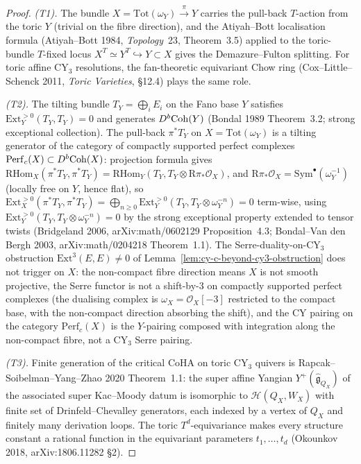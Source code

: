 \begin{proof}
\emph{(T1).} The bundle $X = \mathrm{Tot}(\omega_Y) \xrightarrow{\pi} Y$
carries the pull-back $T$-action from the toric $Y$ (trivial on the
fibre direction), and the Atiyah--Bott localisation formula
(Atiyah--Bott 1984, \emph{Topology}~23, Theorem~3.5) applied to the
toric-bundle $T$-fixed locus
$X^T \simeq Y^T \hookrightarrow Y \subset X$ gives the Demazure--Fulton
splitting. For toric affine CY$_3$ resolutions, the fan-theoretic
equivariant Chow ring (Cox--Little--Schenck 2011, \emph{Toric
Varieties}, \S 12.4) plays the same role.

\emph{(T2).} The tilting bundle $T_Y = \bigoplus_i E_i$ on the Fano
base $Y$ satisfies $\mathrm{Ext}^{>0}_Y(T_Y, T_Y) = 0$ and generates
$D^b\mathrm{Coh}(Y)$ (Bondal 1989 Theorem~3.2; strong exceptional collection).
The pull-back $\pi^* T_Y$ on $X = \mathrm{Tot}(\omega_Y)$ is a tilting
generator of the category of compactly supported perfect complexes
$\mathrm{Perf}_c(X) \subset D^b\mathrm{Coh}(X)$: projection formula gives
$\mathrm{R}\mathrm{Hom}_X(\pi^* T_Y, \pi^* T_Y) = \mathrm{R}\mathrm{Hom}_Y(T_Y, T_Y
\otimes \mathrm{R}\pi_* \mathcal O_X)$, and $\mathrm{R}\pi_* \mathcal O_X
= \mathrm{Sym}^\bullet(\omega_Y^{-1})$ (locally free on $Y$, hence
flat), so $\mathrm{Ext}^{>0}_X(\pi^* T_Y, \pi^* T_Y)
= \bigoplus_{n \geq 0} \mathrm{Ext}^{>0}_Y(T_Y, T_Y \otimes
\omega_Y^{-n}) = 0$ term-wise, using $\mathrm{Ext}^{>0}_Y(T_Y, T_Y
\otimes \omega_Y^{-n}) = 0$ by the strong exceptional property extended
to tensor twists (Bridgeland 2006, arXiv:math/0602129 Proposition~4.3;
Bondal--Van den Bergh 2003, arXiv:math/0204218 Theorem~1.1). The
Serre-duality-on-CY$_3$ obstruction
$\mathrm{Ext}^3(E, E) \neq 0$ of Lemma~\ref{lem:cy-c-beyond-cy3-obstruction}
does not trigger on $X$: the non-compact fibre direction means $X$ is
not smooth projective, the Serre functor is not a shift-by-$3$ on
compactly supported perfect complexes (the dualising complex is
$\omega_X = \mathcal O_X[-3]$ restricted to the compact base, with the
non-compact direction absorbing the shift), and the CY pairing on the
category $\mathrm{Perf}_c(X)$ is the $Y$-pairing composed with
integration along the non-compact fibre, not a CY$_3$ Serre pairing.

\emph{(T3).} Finite generation of the critical CoHA on toric CY$_3$
quivers is Rapcak--Soibelman--Yang--Zhao 2020 Theorem~1.1: the super
affine Yangian $Y^+(\widehat{\mathfrak g}_{Q_X})$ of the associated
super Kac--Moody datum is isomorphic to $\mathcal H(Q_X, W_X)$ with
finite set of Drinfeld--Chevalley generators, each indexed by a vertex
of $Q_X$ and finitely many derivation loops. The toric $T^d$-equivariance
makes every structure constant a rational function in the equivariant
parameters $t_1, \ldots, t_d$ (Okounkov 2018, arXiv:1806.11282 \S 2).


\end{proof}
